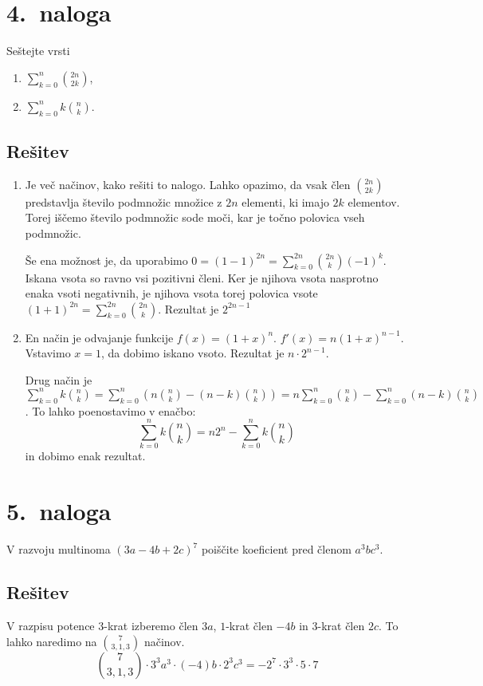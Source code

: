 \documentclass[11pt]{article}
\begin{document}
\section*{4.~naloga}
Seštejte vrsti \begin{enumerate}[label=(\alph*)]
    \item \(\sum_{k=0}^{n}\binom{2n}{2k}\),
    \item \(\sum_{k=0}^{n}k\binom{n}{k}\).
\end{enumerate}

\subsection*{Rešitev}
\begin{enumerate}[label=(\alph*)]
    \item Je več načinov, kako rešiti to nalogo. Lahko opazimo, da vsak člen \(\binom{2n}{2k}\) predstavlja število
        podmnožic množice z \(2n\) elementi, ki imajo \(2k\) elementov. Torej iščemo število podmnožic sode moči, kar je točno polovica vseh podmnožic.
        
        Še ena možnost je, da uporabimo \(0 = {\left(1 - 1\right)}^{2n} = \sum_{k=0}^{2n}\binom{2n}{k}{\left(-1\right)}^k\). Iskana vsota so ravno
        vsi pozitivni členi. Ker je njihova vsota nasprotno enaka vsoti negativnih, je njihova vsota torej polovica vsote
        \({\left(1 + 1\right)}^{2n} = \sum_{k=0}^{2n}\binom{2n}{k}\). Rezultat je \(2^{2n-1}\)
    \item En način je odvajanje funkcije \(f(x) = {(1 + x)}^n\). \(f'(x) = n{(1 + x)}^{n-1}\). Vstavimo \(x = 1\), da dobimo
        iskano vsoto. Rezultat je \(n \cdot 2^{n-1}\). 
        
        Drug način je \(\sum_{k=0}^{n} k\binom{n}{k} = \sum_{k=0}^{n} \left(n\binom{n}{k} - \left(n - k\right)\binom{n}{k}\right)
        = n \sum_{k=0}^{n} \binom{n}{k} - \sum_{k=0}^{n} \left(n - k\right)\binom{n}{k}\). To lahko poenostavimo v enačbo:
        \[\sum_{k=0}^{n} k\binom{n}{k} = n 2 ^ n - \sum_{k=0}^{n} k\binom{n}{k}\]
        in dobimo enak rezultat. 
\end{enumerate}

\section*{5.~naloga}
V razvoju multinoma \({\left(3a - 4b + 2c\right)}^7\) poiščite koeficient pred členom \(a^3bc^3\).

\subsection*{Rešitev}
V razpisu potence \(3\)-krat izberemo člen \(3a\), \(1\)-krat člen \(-4b\) in \(3\)-krat člen \(2c\). To lahko naredimo na \(\binom{7}{3,1,3}\) načinov.
\[\binom{7}{3,1,3} \cdot 3^3a^3 \cdot (-4)b \cdot 2^3c^3 = -2^7 \cdot 3^3 \cdot 5 \cdot 7\]
\end{document}
